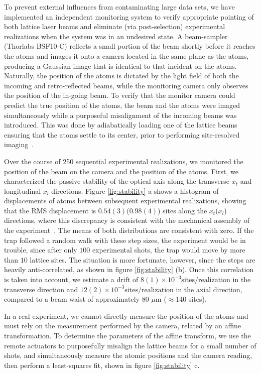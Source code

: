 \documentclass[twocolumn,aps,pra,showpacs,preprintnumbers,bibnotes]{revtex4-1}
\begin{document}
To prevent external influences from contaminating large data sets, we have implemented an independent monitoring system to verify appropriate pointing of both lattice laser beams and eliminate (via post-selection) experimental realizations when the system was in an undesired state.
A beam-sampler (Thorlabs BSF10-C) reflects a small portion of the beam shortly before it reaches the atoms and images it onto a camera located in the same plane as the atoms, producing a Gaussian image that is identical to that incident on the atoms.
Naturally, the position of the atoms is dictated by the light field of both the incoming and retro-reflected beams, while the monitoring camera only observes the position of the in-going beam.
To verify that the monitor camera could predict the true position of the atoms, the beam and the atoms were imaged simultaneously while a purposeful misalignment of the incoming beams was introduced.
This was done by adiabatically loading one of the lattice beams ensuring that the atoms settle to its center, prior to performing site-resolved imaging~\cite{Parsons2015}.

Over the course of 250 sequential experimental realizations, we monitored the position of the beam on the camera and the position of the atoms. 
First, we characterized the passive stability of the optical axis along the transverse $x_t$ and longitudinal $x_l$ directions. 
Figure \ref{fig:stability} a shows a histogram of displacements of atoms between subsequent experimental realizations, showing that the RMS displacement is $0.54(3)$($0.98(4)$) sites along the $x_t$($x_l$) directions, where this discrepancy is consistent with the mechanical assembly of the experiment~\cite{Huber2014}.
The means of both distributions are consistent with zero.
If the trap followed a random walk with these step sizes, the experiment would be in trouble, since after only $100$ experimental shots, the trap would move by more than $10$ lattice sites.
The situation is more fortunate, however, since the steps are heavily anti-correlated, as shown in figure \ref{fig:stability} (b).
Once this correlation is taken into account, we estimate a drift of $8(1)\times 10^{-3}\mathrm{sites}/\mathrm{realization}$ in the transverse direction and $12(2)\times 10^{-3}\mathrm{sites}/\mathrm{realization}$ in the axial direction, compared to a beam waist of approximately $80$ $\mu$m ($\approx 140$ sites).


In a real experiment, we cannot directly measure the position of the atoms and must rely on the measurement performed by the camera, related by an affine transformation.
To determine the parameters of the affine transform, we use the remote actuators to purposefully misalign the lattice beams for a small number of shots, and simultaneously measure the atomic positions and the camera reading, then perform a least-squares fit, shown in figure \ref{fig:stability} c.
\end{document}
